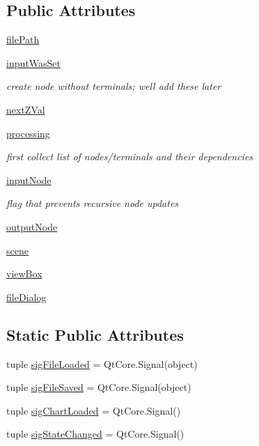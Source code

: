 \subsection*{Public Attributes}
\begin{DoxyCompactItemize}
\item 
\hyperlink{classFlowchart_1_1Flowchart_ad3ef7026c868ea6f6b29d9431b28a4b9}{file\+Path}
\item 
\hyperlink{classFlowchart_1_1Flowchart_a3174a7d3c4a0a4c1d599c2b870e4aa49}{input\+Was\+Set}
\begin{DoxyCompactList}\small\item\em create node without terminals; we\textquotesingle{}ll add these later \end{DoxyCompactList}\item 
\hyperlink{classFlowchart_1_1Flowchart_a5f0e24985b1b2e763104f6f3a0e7d36d}{next\+Z\+Val}
\item 
\hyperlink{classFlowchart_1_1Flowchart_a7a15f175c575286a959cf951028df731}{processing}
\begin{DoxyCompactList}\small\item\em first collect list of nodes/terminals and their dependencies \end{DoxyCompactList}\item 
\hyperlink{classFlowchart_1_1Flowchart_a84ef6d80eda5bb411ed8fc42d498abf8}{input\+Node}
\begin{DoxyCompactList}\small\item\em flag that prevents recursive node updates \end{DoxyCompactList}\item 
\hyperlink{classFlowchart_1_1Flowchart_a40f1e9146fe716f08de3e409e928cfd0}{output\+Node}
\item 
\hyperlink{classFlowchart_1_1Flowchart_aa6e46a6d69bd63162b96244089e2278f}{scene}
\item 
\hyperlink{classFlowchart_1_1Flowchart_a5886da9b4713cf5497afbfce97ae9053}{view\+Box}
\item 
\hyperlink{classFlowchart_1_1Flowchart_ad625b9fafa1f2a2ba0914b8b00fc0750}{file\+Dialog}
\end{DoxyCompactItemize}
\subsection*{Static Public Attributes}
\begin{DoxyCompactItemize}
\item 
tuple \hyperlink{classFlowchart_1_1Flowchart_a6012334b34647ab6f9f3b1085222e215}{sig\+File\+Loaded} = Qt\+Core.\+Signal(object)
\item 
tuple \hyperlink{classFlowchart_1_1Flowchart_af55a007430b3d3f20fafff072db2062d}{sig\+File\+Saved} = Qt\+Core.\+Signal(object)
\item 
tuple \hyperlink{classFlowchart_1_1Flowchart_a9c8f87ebe300f13b148f52e688ec4602}{sig\+Chart\+Loaded} = Qt\+Core.\+Signal()
\item 
tuple \hyperlink{classFlowchart_1_1Flowchart_a37468c41e4a9ea99422bbe50ea36968a}{sig\+State\+Changed} = Qt\+Core.\+Signal()
\end{DoxyCompactItemize}


